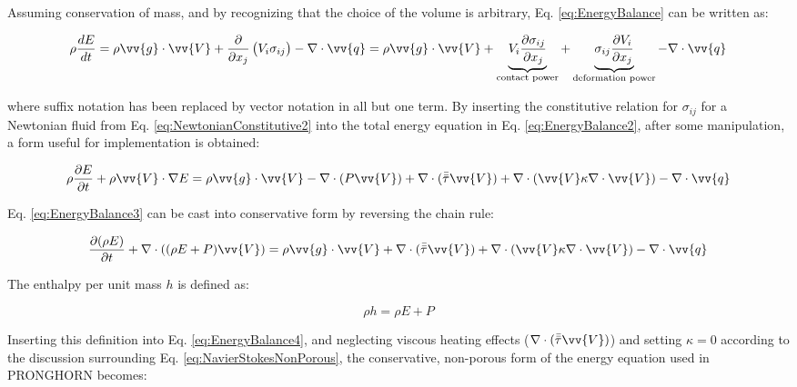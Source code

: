 \documentclass[10pt]{article}
\numberwithin{equation}{section} %
\begin{document}
Assuming conservation of mass, and by recognizing that the choice of the volume is arbitrary, Eq. \eqref{eq:EnergyBalance} can be written as:

\begin{equation}
\label{eq:EnergyBalance2}
\rho\frac{dE}{dt}=\rho \vv{g}\cdot\vv{V}+\frac{\partial}{\partial x_j}\left(V_i\sigma_{ij}\right)-\nabla\cdot\vv{q}=\rho \vv{g}\cdot\vv{V}+\underbrace{V_i\frac{\partial\sigma_{ij}}{\partial x_j}}_\text{contact power}+\underbrace{\sigma_{ij}\frac{\partial V_i}{\partial x_j}}_\text{deformation power}-\nabla\cdot\vv{q}
\end{equation}

where suffix notation has been replaced by vector notation in all but one term. By inserting the constitutive relation for \(\sigma_{ij}\) for a Newtonian fluid from Eq. \eqref{eq:NewtonianConstitutive2} into the total energy equation in Eq. \eqref{eq:EnergyBalance2}, after some manipulation, a form useful for implementation is obtained:

\begin{equation}
\label{eq:EnergyBalance3}
\rho\frac{\partial E}{\partial t}+\rho\vv{V}\cdot\nabla E=\rho \vv{g}\cdot\vv{V}-\nabla\cdot(P\vv{V})+\nabla\cdot(\bar{\bar{\tau}}\vv{V})+\nabla\cdot(\vv{V}\kappa\nabla\cdot\vv{V})-\nabla\cdot\vv{q}
\end{equation}

Eq. \eqref{eq:EnergyBalance3} can be cast into conservative form by reversing the chain rule:

\begin{equation}
\label{eq:EnergyBalance4}
\begin{aligned}
\frac{\partial (\rho E)}{\partial t}+\nabla\cdot((\rho E+P)\vv{V})=\rho \vv{g}\cdot\vv{V}+\nabla\cdot(\bar{\bar{\tau}}\vv{V})+\nabla\cdot(\vv{V}\kappa\nabla\cdot\vv{V})-\nabla\cdot\vv{q}\\
\end{aligned}
\end{equation}

The enthalpy per unit mass \(h\) is defined as:

\begin{equation}
\label{eq:Enthalpy}
\rho h=\rho E +P
\end{equation} %

Inserting this definition into Eq. \eqref{eq:EnergyBalance4}, and neglecting viscous heating effects (\(\nabla\cdot(\bar{\bar{\tau}}\vv{V})\)) and setting \(\kappa=0\) according to the discussion surrounding Eq. \eqref{eq:NavierStokesNonPorous}, the conservative, non-porous form of the energy equation used in PRONGHORN becomes:
\end{document}
